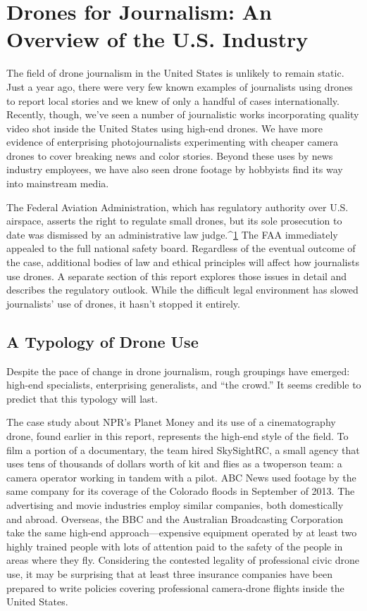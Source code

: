 \chapter{Drones for Journalism: An Overview of the U.S. Industry}
The field of drone journalism in the United States is unlikely to remain
static. Just a year ago, there were very few known examples of journalists
using drones to report local stories and we knew of only a handful of cases
internationally. Recently, though, we've seen a number of journalistic works
incorporating quality video shot inside the United States using high-end
drones. We have more evidence of enterprising photojournalists experimenting
with cheaper camera drones to cover breaking news and color
stories. Beyond these uses by news industry employees, we have also seen
drone footage by hobbyists find its way into mainstream media.

The Federal Aviation Administration, which has regulatory authority over
U.S. airspace, asserts the right to regulate small drones, but its sole prosecution
to date was dismissed by an administrative law judge.^{\href{#endnotes-industry-overview}{1}} The FAA immediately
appealed to the full national safety board. Regardless of the eventual
outcome of the case, additional bodies of law and ethical principles will
affect how journalists use drones. A separate section of this report explores
those issues in detail and describes the regulatory outlook. While the difficult
legal environment has slowed journalists' use of drones, it hasn't
stopped it entirely.

\section{A Typology of Drone Use}
Despite the pace of change in drone journalism, rough groupings have
emerged: high-end specialists, enterprising generalists, and ``the crowd.'' It
seems credible to predict that this typology will last.

The case study about NPR's Planet Money and its use of a cinematography
drone, found earlier in this report, represents the high-end style of the field.
To film a portion of a documentary, the team hired SkySightRC, a small
agency that uses tens of thousands of dollars worth of kit and flies as a twoperson
team: a camera operator working in tandem with a pilot. ABC News
used footage by the same company for its coverage of the Colorado floods
in September of 2013. The advertising and movie industries employ similar
companies, both domestically and abroad. Overseas, the BBC and the Australian
Broadcasting Corporation take the same high-end approach—expensive
equipment operated by at least two highly trained people with lots of
attention paid to the safety of the people in areas where they fly. Considering
the contested legality of professional civic drone use, it may be surprising
that at least three insurance companies have been prepared to write policies
covering professional camera-drone flights inside the United States.

